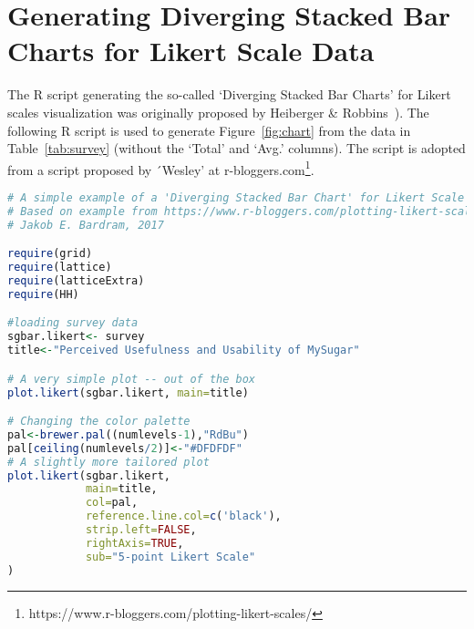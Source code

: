 \section{Generating Diverging Stacked Bar Charts for Likert Scale Data}

The R script generating the so-called `Diverging Stacked Bar Charts' for Likert scales visualization was originally proposed by Heiberger \& Robbins~\cite{heiberger2014design}). The following R script is used to generate Figure~\ref{fig:chart} from the data in Table~\ref{tab:survey} (without the `Total' and `Avg.' columns). The script is adopted from a script proposed by ´Wesley' at r-bloggers.com\footnote{https://www.r-bloggers.com/plotting-likert-scales/}.

\begin{lstlisting}[language=R]
# A simple example of a 'Diverging Stacked Bar Chart' for Likert Scale data on perceived usefulness and usability
# Based on example from https://www.r-bloggers.com/plotting-likert-scales/
# Jakob E. Bardram, 2017

require(grid)
require(lattice)
require(latticeExtra)
require(HH)

#loading survey data
sgbar.likert<- survey
title<-"Perceived Usefulness and Usability of MySugar"

# A very simple plot -- out of the box
plot.likert(sgbar.likert, main=title)

# Changing the color palette
pal<-brewer.pal((numlevels-1),"RdBu")
pal[ceiling(numlevels/2)]<-"#DFDFDF"
# A slightly more tailored plot
plot.likert(sgbar.likert,
            main=title,
            col=pal,
            reference.line.col=c('black'),
            strip.left=FALSE,
            rightAxis=TRUE,
            sub="5-point Likert Scale"
)

\end{lstlisting}
